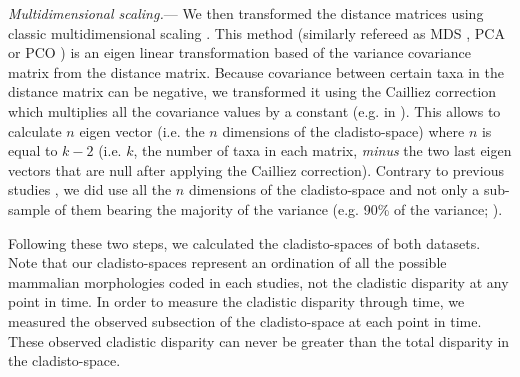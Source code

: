 \documentclass[12pt,letterpaper]{article}
\renewcommand{\subsubsection}[1]{%
\vspace{2ex}
\noindent
\textit{#1.}---}
\begin{document}
\subsubsection{Multidimensional scaling}
We then transformed the distance matrices using classic multidimensional scaling \citep{torgerson1965multidimensional,GOWER01121966,cailliez1983analytical}.
This method (similarly refereed as MDS \citep[e.g.][]{DonohueDim}, PCA \citep[e.g.][]{finlay2015morphological} or PCO \citep[e.g.][]{Brusatte2015}) is an eigen linear transformation based of the variance covariance matrix from the distance matrix.
Because covariance between certain taxa in the distance matrix can be negative, we transformed it using the Cailliez correction \cite{cailliez1983analytical} which multiplies all the covariance values by a constant (e.g. in \citealt{toljagictriassic-jurassic2013}).
This allows to calculate $n$ eigen vector (i.e. the $n$ dimensions of the cladisto-space) where $n$ is equal to $k-2$ (i.e. $k$, the number of taxa in each matrix, \textit{minus} the two last eigen vectors that are null after applying the Cailliez correction).
Contrary to previous studies \citep{brusatte50,cisneros2010,prentice2011,anderson2012using,Hughes20082013,bentonmodels2014}, we did use all the $n$ dimensions of the cladisto-space and not only a sub-sample of them bearing the majority of the variance (e.g. 90\% of the variance; \citealt{Brusatte12092008,toljagictriassic-jurassic2013}).

Following these two steps, we calculated the cladisto-spaces of both datasets.
Note that our cladisto-spaces represent an ordination of all the possible mammalian morphologies coded in each studies, not the cladistic disparity at any point in time.
In order to measure the cladistic disparity through time, we measured the observed subsection of the cladisto-space at each point in time.
These observed cladistic disparity can never be greater than the total disparity in the cladisto-space.

\end{document}

